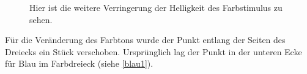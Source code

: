 \documentclass[11pt]{article}
\begin{document}
{\begin{minipage}[t]{0.6\textwidth}
\begin{figure}[H]
\caption{Hier ist die weitere Verringerung der Helligkeit des Farbstimulus zu sehen. }
\label{blau3}
\end{figure}
\end{minipage}}

Für die Veränderung des Farbtons wurde der Punkt entlang der Seiten des Dreiecks ein Stück verschoben. Ursprünglich lag der Punkt in der unteren Ecke für Blau im Farbdreieck (siehe \ref{blau1}).
\end{document}
